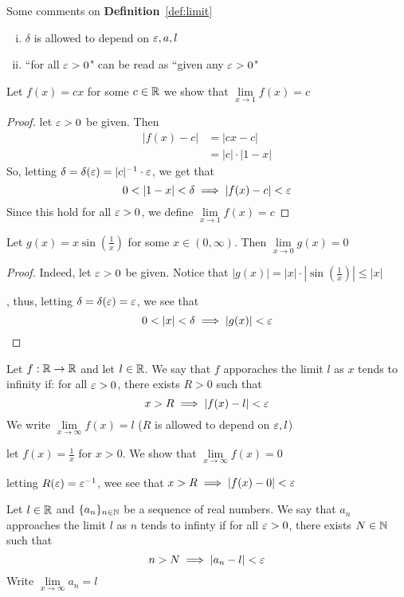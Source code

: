 Some comments on \textbf{Definition}~\ref{def:limit}
\begin{enumerate}[(i)]
    \item $\delta$ is allowed to depend on $\varepsilon, a, l$ 
    \item ``for all $\varepsilon > 0$" can be read as ``given any $\varepsilon > 0$"
\end{enumerate}

\begin{example*}
    Let $f(x) = cx$ for some $c \in \mathbb R$ we show that $\lim\limits_{x \to 1} f(x) = c$
\end{example*}
\begin{proof}
    let $\varepsilon > 0$ be given. Then 
    \begin{align*}
        |f(x)-c|&=|cx-c|\\
        &=|c|\cdot|1-x|
    \end{align*}
    So, letting $\delta=\delta(\varepsilon)=|c|^{-1}\cdot\varepsilon$, we get that
    $$0 < |1-x| < \delta \implies |f(x)-c| < \varepsilon$$
    Since this hold for all $\varepsilon > 0$, we define $\lim\limits_{x \to 1} f(x) = c$
\end{proof}

\begin{example*}
    Let $g(x) = x\sin(\frac{1}{x})$ for some $x \in (0, \infty)$. Then $\lim\limits_{x \to 0} g(x) = 0$
\end{example*}
\begin{proof}
    Indeed, let $\varepsilon > 0$ be given.
    Notice that $|g(x)| = |x|\cdot|\sin(\frac{1}{x})| \leq |x|$
    
    , thus, letting $\delta=\delta(\varepsilon)=\varepsilon$, we see that
    $$0 < |x| < \delta \implies |g(x)| < \varepsilon$$
\end{proof}

\begin{definition}
    Let $f: \mathbb R \rightarrow \mathbb R$ and let $l \in \mathbb R$. We say that $f$ apporaches the limit $l$ as $x$ tends to infinity if:
    for all $\varepsilon > 0$, there exists $R > 0$ such that 
    $$x > R \implies |f(x)-l| < \varepsilon$$
    We write $\lim\limits_{x \to \infty} f(x) = l$
    ($R$ is allowed to depend on $\varepsilon, l$)
\end{definition}

\begin{example*}
    let $f(x) = \frac{1}{x}$ for $x > 0$. We show that $\lim\limits_{x \to \infty} f(x) = 0$

    letting $R(\varepsilon)=\varepsilon^{-1}$, wee see that $x > R \implies |f(x) - 0| < \varepsilon$
\end{example*}
\begin{definition}
    Let $l \in \mathbb R$ and $\{a_n\}_{n\in\mathbb N}$ be a sequence of real numbers.
    We say that $a_n$ approaches the limit $l$ as $n$ tends to infinty if
    for all $\varepsilon > 0$, there exists $N\in \mathbb N$ such that 
    $$n > N \implies |a_n - l| < \varepsilon$$
    Write $\lim\limits_{x \to \infty  } a_n= l$
\end{definition}

